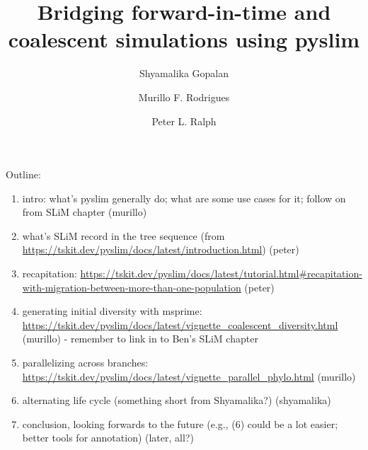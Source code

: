 \documentclass[12pt]{article}
\begin{document}
\title{Bridging forward-in-time and coalescent simulations using pyslim}
\author[1]{Shyamalika Gopalan}
\author[2,3]{Murillo F. Rodrigues}
\author[3,4]{Peter L. Ralph}


\maketitle

\date{}

Outline:

\begin{enumerate}
    \item   intro: what's pyslim generally do;
        what are some use cases for it; follow on from SLiM chapter (murillo)
    \item   what's SLiM record in the tree sequence
        (from \url{https://tskit.dev/pyslim/docs/latest/introduction.html}) (peter)
    \item   recapitation:
        \url{https://tskit.dev/pyslim/docs/latest/tutorial.html#recapitation-with-migration-between-more-than-one-population}  (peter)
    \item   generating initial diversity with msprime:
        \url{https://tskit.dev/pyslim/docs/latest/vignette_coalescent_diversity.html} (murillo)
        - remember to link in to Ben's SLiM chapter
    \item   parallelizing across branches:
        \url{https://tskit.dev/pyslim/docs/latest/vignette_parallel_phylo.html} (murillo)
    \item   alternating life cycle (something short from Shyamalika?) (shyamalika)
    \item   conclusion, looking forwards to the future (e.g., (6) could be a lot easier; better tools for annotation) (later, all?)
\end{enumerate}
\end{document}
